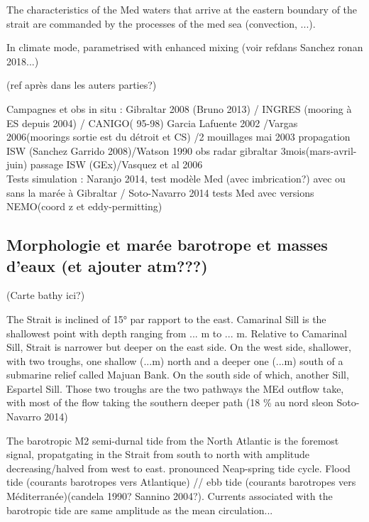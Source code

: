 The characteristics of the Med waters that arrive at the eastern boundary of the strait are commanded by the processes of the med sea (convection, ...). 


In climate mode, parametrised with enhanced mixing (voir refdans Sanchez ronan 2018...)

(ref après dans les auters parties?)

Campagnes et obs in situ : Gibraltar 2008 (Bruno 2013) / INGRES (mooring à ES depuis 2004) / CANIGO( 95-98) Garcia Lafuente 2002 /Vargas 2006(moorings sortie est du détroit et CS) /2 mouillages mai 2003 propagation ISW (Sanchez Garrido 2008)/Watson 1990 obs radar gibraltar 3mois(mars-avril-juin) passage ISW (GEx)/Vasquez et al 2006\\

Tests simulation : Naranjo 2014, test modèle Med (avec imbrication?) avec ou sans la marée à Gibraltar / Soto-Navarro 2014 tests Med avec versions NEMO(coord z et eddy-permitting)



\subsection{Morphologie et marée barotrope et masses d'eaux (et ajouter atm???)}

(Carte bathy ici?)

The Strait is inclined of 15° par rapport to the east. Camarinal Sill is the shallowest point with depth ranging from ... m to ... m. Relative to Camarinal Sill, Strait is narrower but deeper on the east side. On the west side, shallower, with two troughs, one shallow (...m) north and a deeper one (...m) south of a submarine relief called Majuan Bank. On the south side of which, another Sill, Espartel Sill. Those two troughs are the two pathways the MEd outflow take, with most of the flow taking the southern deeper path (18 \% au nord sleon Soto-Navarro 2014)



The barotropic M2 semi-durnal tide from the North Atlantic is the foremost signal, propatgating in the Strait from south to north with amplitude decreasing/halved from west to east. pronounced Neap-spring tide cycle.  Flood tide (courants barotropes vers Atlantique) // ebb tide (courants barotropes vers Méditerranée)(candela 1990? Sannino 2004?). Currents associated with the barotropic tide are same amplitude as the mean circulation...


